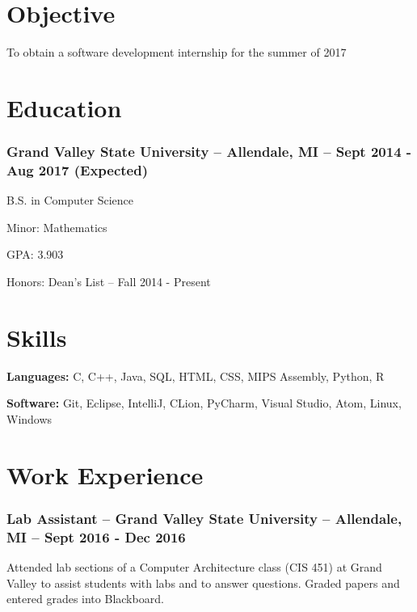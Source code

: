 \documentclass{article}
\begin{document}
	\hfill				%

	\section*{Objective}
	\begin{addmargin}[1em]{0em}
		To obtain a software development internship for the summer of 2017
	\end{addmargin}

	\section*{Education}

		\subsubsection{Grand Valley State University -- Allendale, MI -- Sept 2014 - Aug 2017 (Expected)}
			\begin{addmargin}[1em]{0em}

				B.S. in Computer Science

				Minor: Mathematics

				GPA: 3.903

				Honors: Dean's List -- Fall 2014 - Present
			\end{addmargin}

	\section*{Skills}
	\begin{addmargin}[1em]{0em}
		\textbf{Languages:} C, C++, Java, SQL, HTML, CSS, MIPS Assembly, Python, R

		\textbf{Software:} Git, Eclipse, IntelliJ, CLion, PyCharm, Visual Studio, Atom, Linux, Windows
	\end{addmargin}

	\section*{Work Experience}

		\subsubsection{Lab Assistant -- Grand Valley State University -- Allendale, MI -- Sept 2016 - Dec 2016}
			\begin{addmargin}[1em]{0em}
				Attended lab sections of a Computer Architecture class (CIS 451) at Grand Valley to assist students with labs and to answer questions. Graded papers and entered grades into Blackboard.
			\end{addmargin}
\end{document}
